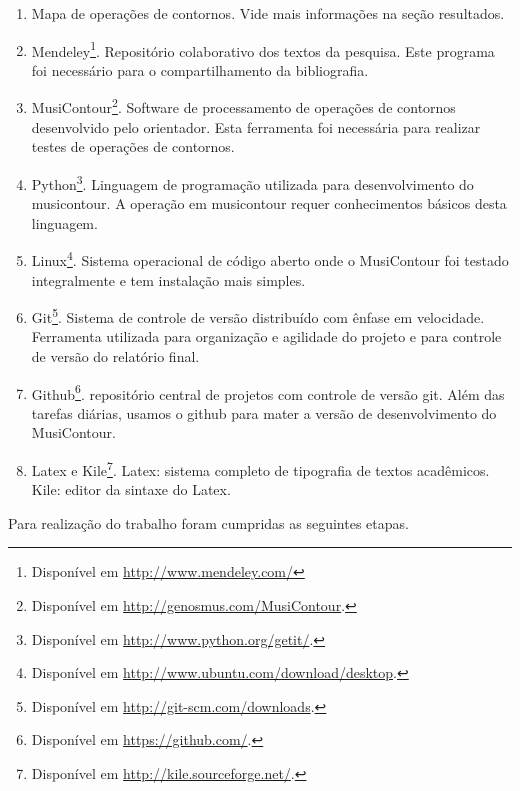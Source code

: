 \documentclass[11pt]{article}
\begin{document}
\begin{enumerate}
\item Mapa de operações de contornos. Vide mais
  informações na seção resultados.
\item Mendeley\footnote{Disponível em
    \url{http://www.mendeley.com/}}. Repositório colaborativo dos
  textos da pesquisa. Este programa foi necessário para o
  compartilhamento da bibliografia.
\item MusiContour\footnote{Disponível em
    \url{http://genosmus.com/MusiContour}.}. Software de processamento
  de operações de contornos desenvolvido pelo orientador. Esta
  ferramenta foi necessária para realizar testes de operações de
  contornos.
\item Python\footnote{Disponível em
  \url{http://www.python.org/getit/}.}. Linguagem de programação utilizada para
  desenvolvimento do musicontour. A operação em musicontour requer conhecimentos
  básicos desta linguagem.
\item Linux\footnote{Disponível em
  \url{http://www.ubuntu.com/download/desktop}.}. Sistema operacional
  de código aberto onde o MusiContour foi testado integralmente e 
  tem instalação mais simples.
\item Git\footnote{Disponível em
  \url{http://git-scm.com/downloads}.}. Sistema de controle de versão
distribuído com ênfase em velocidade. Ferramenta utilizada para organização
e agilidade do projeto e para controle de versão do relatório final.
\item Github\footnote{Disponível em
  \url{https://github.com/}.}. repositório central de projetos com controle
  de versão git. Além das tarefas diárias, usamos o github para mater a versão
  de desenvolvimento do MusiContour.
\item Latex e Kile\footnote{Disponível em
  \url{http://kile.sourceforge.net/}.}. Latex: sistema completo de tipografia 
  de textos acadêmicos. Kile: editor da sintaxe do Latex. 
\end{enumerate}

Para realização do trabalho foram cumpridas as seguintes etapas.
\end{document}
